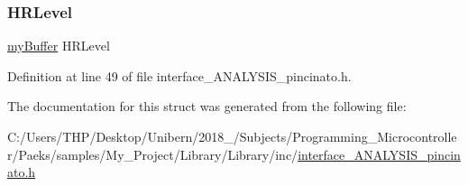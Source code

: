 \subsubsection{\texorpdfstring{H\+R\+Level}{HRLevel}}
{\footnotesize\ttfamily \mbox{\hyperlink{interface___a_n_a_l_y_s_i_s__pincinato_8h_a3184f2c2dc500ffc383f0a5e8e7f21f0}{my\+Buffer}} H\+R\+Level}



Definition at line 49 of file interface\+\_\+\+A\+N\+A\+L\+Y\+S\+I\+S\+\_\+pincinato.\+h.



The documentation for this struct was generated from the following file\+:\begin{DoxyCompactItemize}
\item 
C\+:/\+Users/\+T\+H\+P/\+Desktop/\+Unibern/2018\+\_/\+Subjects/\+Programming\+\_\+\+Microcontroller/\+Paeks/samples/\+My\+\_\+\+Project/\+Library/\+Library/inc/\mbox{\hyperlink{interface___a_n_a_l_y_s_i_s__pincinato_8h}{interface\+\_\+\+A\+N\+A\+L\+Y\+S\+I\+S\+\_\+pincinato.\+h}}\end{DoxyCompactItemize}
